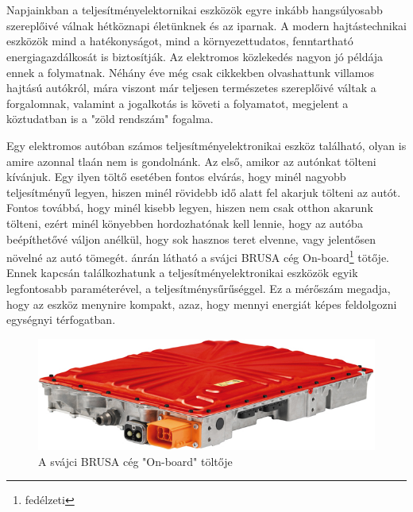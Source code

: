 \chapter*{\bevezeto}

Napjainkban a teljesítményelektornikai eszközök egyre inkább hangsúlyosabb szereplőivé válnak hétköznapi életünknek és az iparnak. A modern hajtástechnikai eszközök mind a hatékonyságot, mind a környezettudatos, fenntartható energiagazdálkosát is biztosítják. Az elektromos közlekedés nagyon jó példája ennek a folymatnak. Néhány éve még csak cikkekben olvashattunk villamos hajtású autókról, mára viszont már teljesen természetes szereplőivé váltak a forgalomnak, valamint a jogalkotás is követi a folyamatot, megjelent a köztudatban is a "zöld rendszám" fogalma. 

Egy elektromos autóban számos teljesítményelektronikai eszköz található, olyan is amire azonnal tlaán nem is gondolnánk. Az első, amikor az autónkat tölteni kívánjuk. Egy ilyen töltő esetében fontos elvárás, hogy minél nagyobb teljesítményű legyen, hiszen minél rövidebb idő alatt fel akarjuk tölteni az autót. Fontos továbbá, hogy minél kisebb legyen, hiszen nem csak otthon akarunk tölteni, ezért minél könyebben hordozhatónak kell lennie, hogy az autóba beépíthetővé váljon anélkül, hogy sok hasznos teret elvenne, vagy jelentősen növelné az autó tömegét.  ánrán látható a svájci BRUSA cég On-board\footnote{fedélzeti} tötője. Ennek kapcsán találkozhatunk a  teljesítményelektronikai eszközök egyik legfontosabb paraméterével, a teljesítménysűrűséggel. Ez a mérőszám megadja, hogy az eszköz menynire kompakt, azaz, hogy mennyi energiát képes feldolgozni egységnyi térfogatban.

\begin{figure}[!ht]
	\centering
	\includegraphics[width = \textwidth]{figures/brusa_charger.jpg}
	\caption{A svájci BRUSA cég "On-board" töltője} 
	\label{fig:brusa}
\end{figure}

